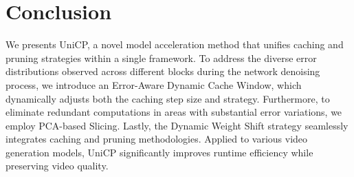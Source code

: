\section{Conclusion}
\label{sec:conclusion}
We presents UniCP, a novel model acceleration method that unifies caching and pruning strategies within a single framework. To address the diverse error distributions observed across different blocks during the network denoising process, we introduce an Error-Aware Dynamic Cache Window, which dynamically adjusts both the caching step size and strategy. Furthermore, to eliminate redundant computations in areas with substantial error variations, we employ PCA-based Slicing. Lastly, the Dynamic Weight Shift strategy seamlessly integrates caching and pruning methodologies. Applied to various video generation models, UniCP significantly improves runtime efficiency while preserving video quality.
